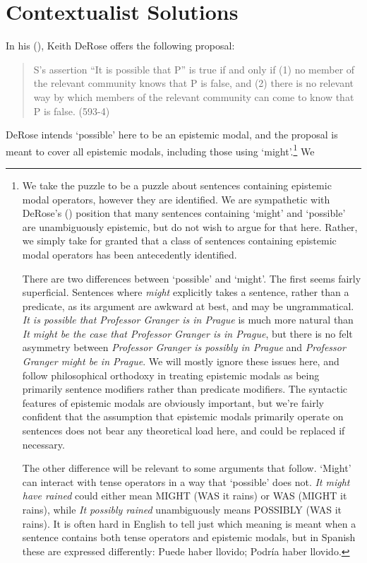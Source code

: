 \documentclass[
  11pt,
  letterpaper,
  DIV=11,
  numbers=noendperiod]{scrartcl}
\begin{document}
\section{Contextualist Solutions}\label{contextualist-solutions}

In his (), Keith DeRose offers the
following proposal:

\begin{quote}
S's assertion ``It is possible that P'' is true if and only if (1) no
member of the relevant community knows that P is false, and (2) there is
no relevant way by which members of the relevant community can come to
know that P is false. (593-4)
\end{quote}

DeRose intends `possible' here to be an epistemic modal, and the
proposal is meant to cover all epistemic modals, including those using
`might'.\footnote{We take the puzzle to be a puzzle about sentences
  containing epistemic modal operators, however they are identified. We
  are sympathetic with DeRose's ()
  position that many sentences containing `might' and `possible' are
  unambiguously epistemic, but do not wish to argue for that here.
  Rather, we simply take for granted that a class of sentences
  containing epistemic modal operators has been antecedently identified.

  There are two differences between `possible' and `might'. The first
  seems fairly superficial. Sentences where \emph{might} explicitly
  takes a sentence, rather than a predicate, as its argument are awkward
  at best, and may be ungrammatical. \emph{It is possible that Professor
  Granger is in Prague} is much more natural than \emph{It might be the
  case that Professor Granger is in Prague}, but there is no felt
  asymmetry between \emph{Professor Granger is possibly in Prague} and
  \emph{Professor Granger might be in Prague}. We will mostly ignore
  these issues here, and follow philosophical orthodoxy in treating
  epistemic modals as being primarily sentence modifiers rather than
  predicate modifiers. The syntactic features of epistemic modals are
  obviously important, but we're fairly confident that the assumption
  that epistemic modals primarily operate on sentences does not bear any
  theoretical load here, and could be replaced if necessary.

  The other difference will be relevant to some arguments that follow.
  `Might' can interact with tense operators in a way that `possible'
  does not. \emph{It might have rained} could either mean MIGHT (WAS it
  rains) or WAS (MIGHT it rains), while \emph{It possibly rained}
  unambiguously means POSSIBLY (WAS it rains). It is often hard in
  English to tell just which meaning is meant when a sentence contains
  both tense operators and epistemic modals, but in Spanish these are
  expressed differently: Puede haber llovido; Podría haber llovido.} We
\end{document}
